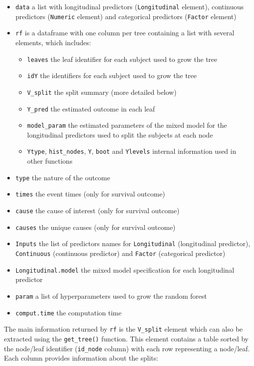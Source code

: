\begin{itemize}
\tightlist
\item
  \texttt{data} a list with longitudinal predictors (\texttt{Longitudinal} element), continuous predictors (\texttt{Numeric} element) and categorical predictors (\texttt{Factor} element)
\item
  \texttt{rf} is a dataframe with one column per tree containing a list with several elements, which includes:

  \begin{itemize}
  \tightlist
  \item
    \texttt{leaves} the leaf identifier for each subject used to grow the tree
  \item
    \texttt{idY} the identifiers for each subject used to grow the tree
  \item
    \texttt{V\_split} the split summary (more detailed below)
  \item
    \texttt{Y\_pred} the estimated outcome in each leaf
  \item
    \texttt{model\_param} the estimated parameters of the mixed model for the longitudinal predictors used to split the subjects at each node
  \item
    \texttt{Ytype}, \texttt{hist\_nodes}, \texttt{Y}, \texttt{boot} and \texttt{Ylevels} internal information used in other functions
  \end{itemize}
\item
  \texttt{type} the nature of the outcome
\item
  \texttt{times} the event times (only for survival outcome)
\item
  \texttt{cause} the cause of interest (only for survival outcome)
\item
  \texttt{causes} the unique causes (only for survival outcome)
\item
  \texttt{Inputs} the list of predictors names for \texttt{Longitudinal} (longitudinal predictor), \texttt{Continuous} (continuous predictor) and \texttt{Factor} (categorical predictor)
\item
  \texttt{Longitudinal.model} the mixed model specification for each longitudinal predictor
\item
  \texttt{param} a list of hyperparameters used to grow the random forest
\item
  \texttt{comput.time} the computation time
\end{itemize}

\noindent The main information returned by \texttt{rf} is the \texttt{V\_split} element which can also be extracted using the \texttt{get\_tree()} function. This element contains a table sorted by the node/leaf identifier (\texttt{id\_node} column) with each row representing a node/leaf. Each column provides information about the splits:

